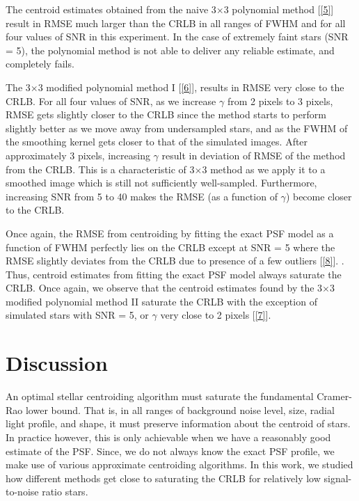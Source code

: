 \documentclass[12pt, preprint]{aastex}
\begin{document}
The centroid estimates obtained from the naive 3$\times$3 polynomial method [\ref{5}]
result in RMSE much larger than the CRLB in all ranges of FWHM and for all four
values of SNR in this experiment. In the case of extremely faint stars (SNR = 5),
the polynomial method is not able to deliver any reliable estimate, and completely fails.

The 3$\times$3 modified polynomial method I [\ref{6}], results in RMSE very close to the CRLB.
For all four values of SNR, as we increase $\gamma$ from 2 pixels to 3 pixels,
RMSE gets slightly closer to the CRLB since the method starts to perform
slightly better as we move away from undersampled stars, and as the FWHM of the smoothing kernel
gets closer to that of the simulated images.
After approximately 3 pixels, increasing $\gamma$ result in deviation of RMSE of the method from the CRLB.
This is a characteristic of 3$\times$3 method as we apply it to a smoothed image which is still not sufficiently
well-sampled.  Furthermore, increasing SNR from 5 to 40 makes the RMSE (as a function of $\gamma$) become
closer to the CRLB.

Once again, the RMSE from centroiding by fitting the exact PSF model as a function of FWHM
perfectly lies on the CRLB except at SNR = 5 where the RMSE slightly deviates
from the CRLB due to presence of a few outliers [\ref{8}].
. Thus, centroid estimates from fitting
the exact PSF model always saturate the CRLB. Once again, we observe that the centroid
estimates found by the 3$\times$3 modified polynomial method II saturate the CRLB with the
exception of simulated stars with SNR = 5, or $\gamma$ very close to 2 pixels [\ref{7}].

\section{Discussion}\label{sec:discussion}

An optimal stellar centroiding algorithm must saturate the fundamental Cramer-Rao lower 
bound. That is, in all ranges of background noise level, size, radial light profile,
and shape, it must preserve information about the centroid of stars. In practice however,
this is only achievable when we have a reasonably good estimate of the PSF. Since, we do not always 
know the exact PSF profile, we make use of various approximate centroiding algorithms. In this work, we
studied how different methods get close to saturating the CRLB for relatively low signal-to-noise ratio
stars.
 
\end{document}
